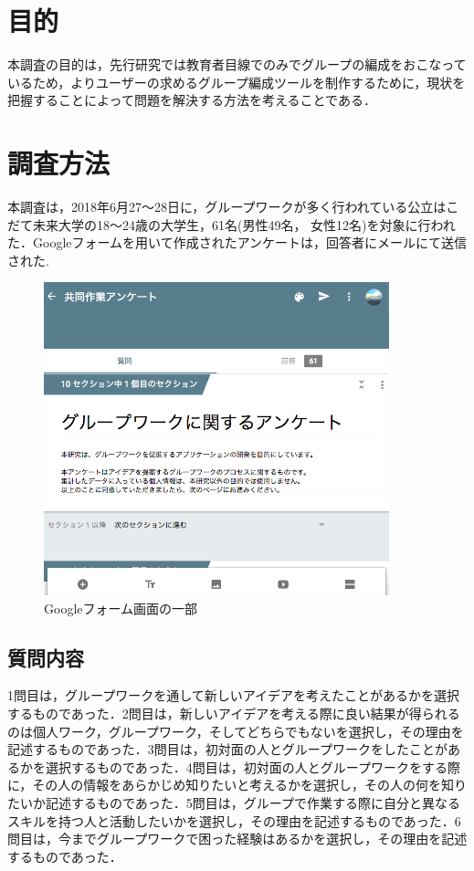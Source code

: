 \documentclass{funthesis}
\begin{document}
\section{目的}

本調査の目的は，先行研究では教育者目線でのみでグループの編成をおこなっているため，よりユーザーの求めるグループ編成ツールを制作するために，現状を把握することによって問題を解決する方法を考えることである．

\section{調査方法}

本調査は，2018年6月27〜28日に，グループワークが多く行われている公立はこだて未来大学の18〜24歳の大学生，61名(男性49名， 女性12名)を対象に行われた．Googleフォームを用いて作成されたアンケートは，回答者にメールにて送信された.
\begin{figure}[H]
 \centering
   \includegraphics[width=100mm]{figures/groupwork1.png}
 \caption{Googleフォーム画面の一部}
 \label{fig:model}
\end{figure}


\subsection{質問内容}

1問目は，グループワークを通して新しいアイデアを考えたことがあるかを選択するものであった．2問目は，新しいアイデアを考える際に良い結果が得られるのは個人ワーク，グループワーク，そしてどちらでもないを選択し，その理由を記述するものであった．3問目は，初対面の人とグループワークをしたことがあるかを選択するものであった．4問目は，初対面の人とグループワークをする際に，その人の情報をあらかじめ知りたいと考えるかを選択し，その人の何を知りたいか記述するものであった．5問目は，グループで作業する際に自分と異なるスキルを持つ人と活動したいかを選択し，その理由を記述するものであった．6問目は，今までグループワークで困った経験はあるかを選択し，その理由を記述するものであった．
\end{document}
